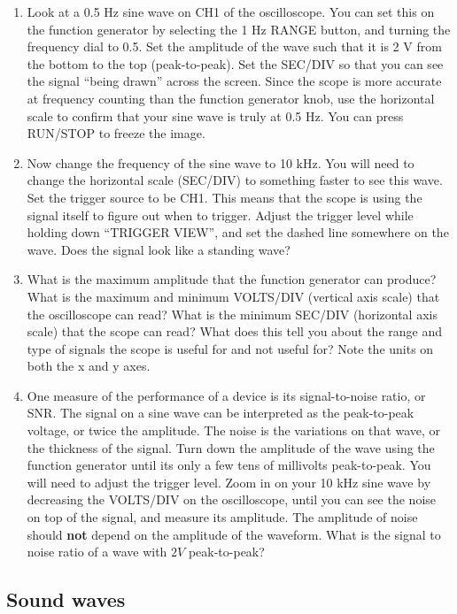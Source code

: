 \begin{enumerate}
\item Look at a 0.5 Hz sine wave on CH1 of the oscilloscope. You can set this on the function generator by selecting the 1 Hz RANGE button, and turning the frequency dial to 0.5. Set the amplitude of the wave such that it is 2 V from the bottom to the top (peak-to-peak). Set the SEC/DIV so that you can see the signal ``being drawn'' across the screen. Since the scope is more accurate at frequency counting than the function generator knob, use the horizontal scale to confirm that your sine wave is truly at 0.5 Hz. You can press RUN/STOP to freeze the image.

\item Now change the frequency of the sine wave to 10 kHz. You will need to change the horizontal scale (SEC/DIV) to something faster to see this wave. Set the trigger source to be CH1. This means that the scope is using the signal itself to figure out when to trigger. Adjust the trigger level while holding down ``TRIGGER VIEW'', and set the dashed line somewhere on the wave. Does the signal look like a standing wave?

\item What is the maximum amplitude that the function generator can produce? What is the maximum and minimum VOLTS/DIV (vertical axis scale) that the oscilloscope can read? What is the minimum SEC/DIV (horizontal axis scale) that the scope can read? What does this tell you about the range and type of signals the scope is useful for and not useful for? Note the units on both the x and y axes.

\item One measure of the performance of a device is its signal-to-noise ratio, or SNR. The signal on a sine wave can be interpreted as the peak-to-peak voltage, or twice the amplitude. The noise is the variations on that wave, or the thickness of the signal. Turn down the amplitude of the wave using the function generator until its only a few tens of millivolts peak-to-peak. You will need to adjust the trigger level. Zoom in on your 10 kHz sine wave by decreasing the VOLTS/DIV on the oscilloscope, until you can see the noise on top of the signal, and measure its amplitude. The amplitude of noise should {\bf{not}} depend on the amplitude of the waveform. What is the signal to noise ratio of a wave with $2V$ peak-to-peak?

\end{enumerate}

\subsection{Sound waves}

